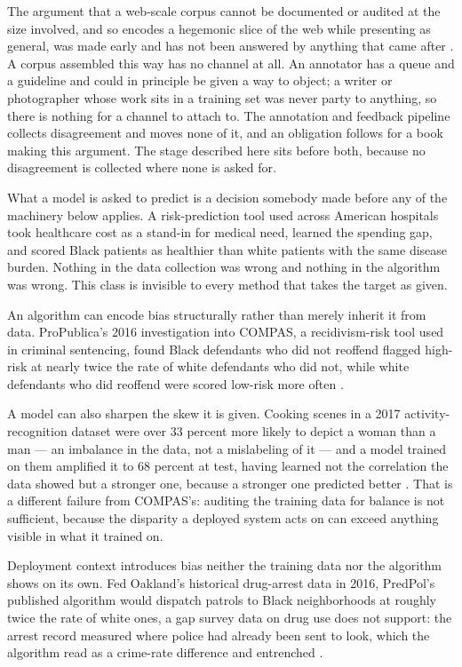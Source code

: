 The argument that a web-scale corpus cannot be documented or audited at the size involved, and so encodes a hegemonic slice of the web while presenting as general, was made early and has not been answered by anything that came after \autocite{bender2021parrots}. A corpus assembled this way has no channel at all. An annotator has a queue and a guideline and could in principle be given a way to object; a writer or photographer whose work sits in a training set was never party to anything, so there is nothing for a channel to attach to. The annotation and feedback pipeline collects disagreement and moves none of it, and an obligation follows for a book making this argument. The stage described here sits before both, because no disagreement is collected where none is asked for.

What a model is asked to predict is a decision somebody made before any of the machinery below applies. A risk-prediction tool used across American hospitals took healthcare cost as a stand-in for medical need, learned the spending gap, and scored Black patients as healthier than white patients with the same disease burden. Nothing in the data collection was wrong and nothing in the algorithm was wrong. This class is invisible to every method that takes the target as given.

An algorithm can encode bias structurally rather than merely inherit it from data. ProPublica's 2016 investigation into COMPAS, a recidivism-risk tool used in criminal sentencing, found Black defendants who did not reoffend flagged high-risk at nearly twice the rate of white defendants who did not, while white defendants who did reoffend were scored low-risk more often \autocite{angwin2016machine}.

A model can also sharpen the skew it is given. Cooking scenes in a 2017 activity-recognition dataset were over 33 percent more likely to depict a woman than a man — an imbalance in the data, not a mislabeling of it — and a model trained on them amplified it to 68 percent at test, having learned not the correlation the data showed but a stronger one, because a stronger one predicted better \autocite{zhao2017men}. That is a different failure from COMPAS's: auditing the training data for balance is not sufficient, because the disparity a deployed system acts on can exceed anything visible in what it trained on.

Deployment context introduces bias neither the training data nor the algorithm shows on its own. Fed Oakland's historical drug-arrest data in 2016, PredPol's published algorithm would dispatch patrols to Black neighborhoods at roughly twice the rate of white ones, a gap survey data on drug use does not support: the arrest record measured where police had already been sent to look, which the algorithm read as a crime-rate difference and entrenched \autocite{lum2016predict}.
